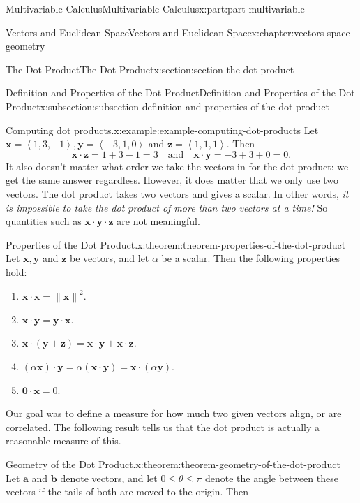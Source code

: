 \documentclass[twoside,10pt,]{tufte-book}
\numberwithin{equation}{part}
\newcommand{\norm}[1]{\left\| #1 \right\|}
\newcommand{\dotprod}[1]{\left\langle #1 \right\rangle}
\begin{document}
\begin{partptx}{Multivariable Calculus}{}{Multivariable Calculus}{}{}{x:part:part-multivariable}
\begin{chapterptx}{Vectors and Euclidean Space}{}{Vectors and Euclidean Space}{}{}{x:chapter:vectors-space-geometry}
\begin{sectionptx}{The Dot Product}{}{The Dot Product}{}{}{x:section:section-the-dot-product}
\begin{subsectionptx}{Definition and Properties of the Dot Product}{}{Definition and Properties of the Dot Product}{}{}{x:subsection:subsection-definition-and-properties-of-the-dot-product}
\begin{example}{Computing dot products.}{x:example:example-computing-dot-products}%
Let \(\mathbf{x} = \dotprod{1,3,-1},\mathbf{y} = \dotprod{-3,1,0}\) and \(\mathbf{z} = \dotprod{1,1,1}\). Then%
%
\begin{equation*}
\mathbf{x}\cdot\mathbf{z} = 1+3-1 = 3\quad\text{and}\quad\mathbf{x}\cdot\mathbf{y} = -3+3+0 = 0.
\end{equation*}
It also doesn't matter what order we take the vectors in for the dot product: we get the same answer regardless. However, it does matter that we only use two vectors. The dot product takes two vectors and gives a scalar. In other words, \emph{it is impossible to take the dot product of more than two vectors at a time!} So quantities such as \(\mathbf{x}\cdot\mathbf{y}\cdot\mathbf{z}\) are not meaningful.%
\end{example}
\begin{theorem}{Properties of the Dot Product.}{}{x:theorem:theorem-properties-of-the-dot-product}%
%
Let \(\mathbf{x},\mathbf{y}\) and \(\mathbf{z}\) be vectors, and let \(\alpha\) be a scalar. Then the following properties hold:%
%
\begin{multicols}{2}
\begin{enumerate}
\item{}\(\displaystyle \mathbf{x}\cdot\mathbf{x} = \norm{\mathbf{x}}^{2}.\)%
\item{}\(\displaystyle \mathbf{x}\cdot\mathbf{y} = \mathbf{y}\cdot\mathbf{x}.\)%
\item{}\(\displaystyle \mathbf{x}\cdot(\mathbf{y}+\mathbf{z}) = \mathbf{x}\cdot\mathbf{y}+\mathbf{x}\cdot\mathbf{z}.\)%
\item{}\(\displaystyle (\alpha\mathbf{x})\cdot\mathbf{y} = \alpha(\mathbf{x}\cdot\mathbf{y}) = \mathbf{x}\cdot(\alpha\mathbf{y}).\)%
\item{}\(\displaystyle \mathbf{0}\cdot\mathbf{x} = 0.\)%
\end{enumerate}
\end{multicols}
\end{theorem}
Our goal was to define a measure for how much two given vectors align, or are correlated. The following result tells us that the dot product is actually a reasonable measure of this.%
\begin{theorem}{Geometry of the Dot Product.}{}{x:theorem:theorem-geometry-of-the-dot-product}%
%
Let \(\mathbf{a}\) and \(\mathbf{b}\) denote vectors, and let \(0\leq\theta\leq\pi\) denote the angle between these vectors if the tails of both are moved to the origin. Then%

\end{theorem}
\end{subsectionptx}
\end{sectionptx}
\end{chapterptx}
\end{partptx}
\end{document}
